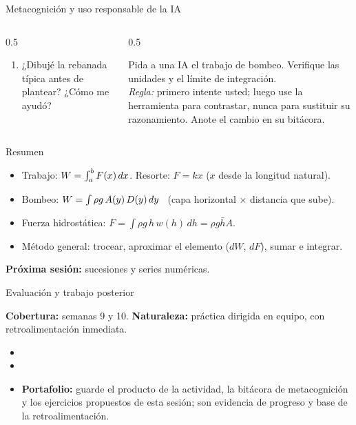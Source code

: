 \documentclass[10pt,aspectratio=169]{beamer}
\begin{document}
\begin{frame}{Metacognición y uso responsable de la IA}
  \small
  \begin{columns}[t]
    \begin{column}{0.5\textwidth}
      \begin{metacog}
        \begin{enumerate}
          \metacomun
          \item ¿Dibujé la rebanada típica antes de plantear? ¿Cómo me ayudó?
        \end{enumerate}
      \end{metacog}
    \end{column}
    \begin{column}{0.5\textwidth}
      \begin{iabox}
        Pida a una IA el trabajo de bombeo. Verifique las unidades y el límite de integración.\\[2pt]
        \textit{Regla:} primero intente usted; luego use la herramienta para contrastar, nunca para sustituir su razonamiento. Anote el cambio en su bitácora.
      \end{iabox}
    \end{column}
  \end{columns}
\end{frame}

\begin{frame}{Resumen}
  \begin{itemize}
    \item Trabajo: $W=\int_a^bF(x)\,dx$. Resorte: $F=kx$ ($x$ desde la longitud natural).
    \item Bombeo: $W=\int\rho g\,A(y)\,D(y)\,dy$ \ (capa horizontal $\times$ distancia que sube).
    \item Fuerza hidrostática: $F=\int\rho g\,h\,w(h)\,dh=\rho g\bar hA$.
    \item Método general: trocear, aproximar el elemento ($dW$, $dF$), sumar e integrar.
  \end{itemize}
  \vspace{3mm}
  \textbf{Próxima sesión:} sucesiones y series numéricas.
\end{frame}


\begin{frame}{Evaluación y trabajo posterior}
  \small
  \begin{evalbox}
    \textbf{Cobertura:} semanas 9 y 10. \textbf{Naturaleza:} práctica dirigida en equipo, con retroalimentación inmediata.
  \end{evalbox}
  \begin{itemize}
    \item \criterios
    \item \declaracionia
    \item \textbf{Portafolio:} guarde el producto de la actividad, la bitácora de metacognición y los ejercicios propuestos de esta sesión; son evidencia de progreso y base de la retroalimentación.
  \end{itemize}
\end{frame}
\end{document}
